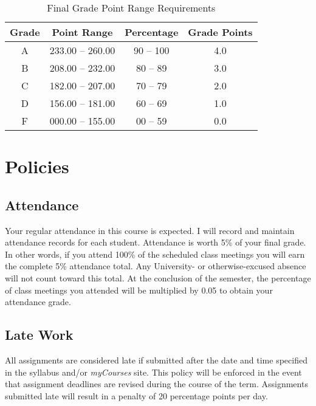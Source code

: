 \documentclass[article]{article}
\begin{document}
\begin{table}[H]
\begin{center}
\caption{Final Grade Point Range Requirements}
\label{finalgrades}
\vspace{3mm}
\begin{tabular}{cccc}
\hline
\bf{Grade} & \bf{Point Range} & \bf{Percentage} & \bf{Grade Points}\\
\hline
A & 233.00 -- 260.00 & 90 -- 100 & 4.0\\ 
B & 208.00 -- 232.00 & 80 -- 89  & 3.0\\ 
C & 182.00 -- 207.00 & 70 -- 79  & 2.0\\ 
D & 156.00 -- 181.00 & 60 -- 69  & 1.0\\ 
F & 000.00 -- 155.00 & 00 -- 59  & 0.0\\
\hline
\end{tabular}
\end{center}
\end{table}

\section{Policies}

\subsection{Attendance} \label{sec:attendance}
Your regular attendance in this course is expected. I will record and maintain attendance records for each student. Attendance is worth 5\% of your final grade. In other words, if you attend 100\% of the scheduled class meetings you will earn the complete 5\% attendance total. Any University- or otherwise-excused absence will not count toward this total. At the conclusion of the semester, the percentage of class meetings you attended will be multiplied by 0.05 to obtain your attendance grade.

\subsection{Late Work} \label{sec:latework}
All assignments are considered late if submitted after the date and time specified in the syllabus and/or {\em{myCourses}} site.  This policy will be enforced in the event that assignment deadlines are revised during the course of the term.  Assignments submitted late will result in a penalty of 20 percentage points per day.\\
\end{document}
